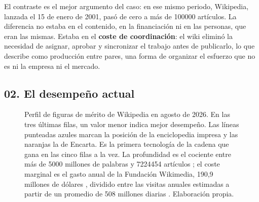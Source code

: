 \documentclass[11pt,letterpaper]{article}
\newcommand{\fomgrid}[1]{%
  \foreach \e in {-3,-2,...,9} {%
    \pgfmathsetmacro{\xg}{0.92*(\e+3)}%
    \draw[gray!16] (\xg,-0.45) -- (\xg,#1);%
  }%
  \foreach \e/\lab in {-3/{$10^{-3}$}, -1/{$10^{-1}$}, 1/{$10^{1}$},
                       3/{$10^{3}$}, 5/{$10^{5}$}, 7/{$10^{7}$}, 9/{$10^{9}$}} {%
    \pgfmathsetmacro{\xg}{0.92*(\e+3)}%
    \draw[gray!45] (\xg,-0.45) -- (\xg,#1);%
    \node[below, font=\tiny, gray!55!black] at (\xg,-0.45) {\lab};%
  }%
}
\newcommand{\fombar}[5]{%
  \node[left, text width=3.5cm, align=right, font=\scriptsize] at (-0.12,#1) {#4};%
  \fill[#3] (0,#1-0.17) rectangle (#2,#1+0.17);%
  \node[right, font=\scriptsize] at (#2+0.10,#1) {#5};%
}
\newcommand{\rCob}{Cobertura\\\tiny (artículos)}
\newcommand{\rPro}{Profundidad\\\tiny (palabras por artículo)}
\newcommand{\rLat}{Latencia de actualización\\\tiny (segundos)}
\newcommand{\rAcc}{Latencia de acceso\\\tiny (segundos)}
\newcommand{\rCos}[1]{Coste marginal\\por #1\\\tiny (dólares)}
\newcommand{\notafom}{En las tres últimas filas, un valor menor indica mejor
  desempeño.}
\begin{document}
El contraste es el mejor argumento del caso: en ese mismo periodo, Wikipedia,
lanzada el 15 de enero de 2001, pasó de cero a más de \num{100000} artículos. La
diferencia no estaba en el contenido, en la financiación ni en las personas, que
eran las mismas. Estaba en el \textbf{coste de coordinación}: el wiki eliminó la
necesidad de asignar, aprobar y sincronizar el trabajo antes de publicarlo, lo
que \textcite{benkler2002} describe como producción entre pares, una forma de
organizar el esfuerzo que no es ni la empresa ni el mercado.

\subsection*{02. El desempeño actual}

\begin{figure}[ht]
  \centering
  \caption{Perfil de figuras de mérito de Wikipedia en agosto de 2026.
  \notafom{} Las líneas punteadas azules marcan la posición de la enciclopedia
  impresa y las naranjas la de Encarta. Es la primera
  tecnología de la cadena que gana en las cinco filas a la vez. La profundidad
  es el cociente entre más de \num{5000} millones de palabras
  \parencite{pew2026} y \num{7224454} artículos \parencite{wikistats2026}; el
  coste marginal es el gasto anual de la Fundación Wikimedia, 190,9 millones de
  dólares \parencite{wmf2025}, dividido entre las visitas anuales estimadas a
  partir de un promedio de 508 millones diarias \parencite{pew2026}. Elaboración
  propia.}
  \label{fig:fomwiki}
\end{figure}
\end{document}
